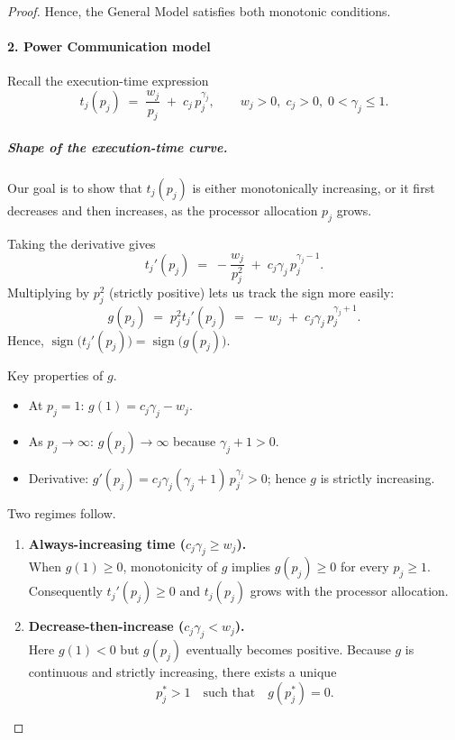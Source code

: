 \documentclass{article}
\begin{document}
\begin{proof}
Hence, the General Model satisfies both monotonic conditions.

\paragraph{2. Power Communication model}

Recall the execution-time expression
\[
t_j(p_j)\;=\;\frac{w_j}{p_j}\;+\;c_j\,p_j^{\gamma_j},
\qquad
w_j>0,\; c_j>0,\; 0<\gamma_j\le 1.
\]

\subparagraph*{Shape of the execution-time curve.}
Our goal is to show that \(t_j(p_j)\) is either monotonically increasing, or it first decreases and then increases, as the processor allocation \(p_j\) grows.

Taking the derivative gives
\[
t_j'(p_j)\;=\;-\frac{w_j}{p_j^{2}}\;+\;c_j\gamma_j\,p_j^{\gamma_j-1}.
\]
Multiplying by \(p_j^{2}\) (strictly positive) lets us track the sign more easily:
\[
g(p_j)\;=\;p_j^{2}t_j'(p_j)\;=\;-\,w_j\;+\;c_j\gamma_j\,p_j^{\gamma_j+1}.
\]
Hence, \(\operatorname{sign}\bigl(t_j'(p_j)\bigr)=\operatorname{sign}\bigl(g(p_j)\bigr)\).

\medskip
Key properties of \(g\).
\begin{itemize}
  \item At \(p_j=1\): \(g(1)=c_j\gamma_j-w_j\).
  \item As \(p_j\to\infty\): \(g(p_j)\to\infty\) because \(\gamma_j+1>0\).
  \item Derivative: \(g'(p_j)=c_j\gamma_j(\gamma_j+1)\,p_j^{\gamma_j}>0\); hence \(g\) is strictly increasing.
\end{itemize}

Two regimes follow.

\begin{enumerate}
\item \textbf{Always-increasing time (\(c_j\gamma_j\ge w_j\)).}\\
      When \(g(1)\ge 0\), monotonicity of \(g\) implies \(g(p_j)\ge 0\) for every \(p_j\ge 1\).
      Consequently \(t_j'(p_j)\ge 0\) and \(t_j(p_j)\) grows with the processor allocation.

\item \textbf{Decrease-then-increase (\(c_j\gamma_j< w_j\)).}\\
      Here \(g(1)<0\) but \(g(p_j)\) eventually becomes positive.
      Because \(g\) is continuous and strictly increasing, there exists a unique
      \[
      p_j^{\ast}>1\quad\text{such that}\quad g(p_j^{\ast})=0 .
      \]
\end{enumerate}


\end{proof}
\end{document}
